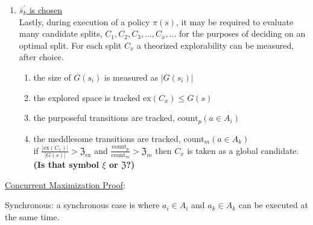 \begin{enumerate}[resume*]
\item \underline{$\bar{s}_k^\prime$ is chosen} \\
  Lastly, during execution of a policy $\pi(s)$, it may be required to evaluate many candidate splits, $C_1, C_2, C_3, \ldots, C_x, \ldots$ for the purposes of deciding on an optimal split. For each split $C_x$ a theorized explorability can be measured, after choice.
  \begin{enumerate}[label=\roman*.]
  \item the size of $G(s_i)$ is measured as $|G(s_i)|$
  \item the explored space is tracked $\text{ex}(C_x)\leq G(s)$
  \item the purposeful transitions are tracked, $\text{count}_p( a \in A_i )$
  \item the meddlesome transitions are tracked, $\text{count}_m( a \in A_k )$\\
    if $\frac{|\text{ex}(C_x)|}{|G(s)|} > \mathfrak{Z}_{\text{ex}}$ and $\frac{\text{count}_p}{\text{count}_m} > \mathfrak{Z}_m$ then $C_x$ is taken as a global candidate.\\
    \textbf{(Is that symbol $\xi$ or $\mathfrak{Z}$?)}
  \end{enumerate}
\end{enumerate}


\underline{Concurrent Maximization Proof}:

Synchronous: a synchronous case is where $a_i \in A_i$ and $a_k \in A_k$ can be executed at the same time.

